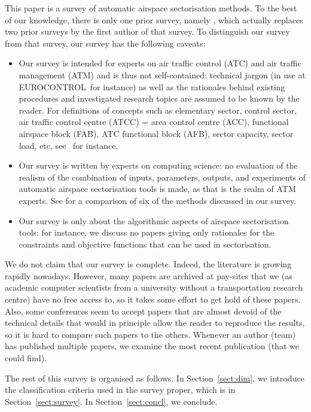 \documentclass[a4paper,12pt]{article}
\newcommand{\EuroControl}{EUROCONTROL}
\begin{document}
This paper is a survey of automatic airspace sectorisation methods.
To the best of our knowledge, there is only one prior survey, namely
\cite{Zelinski:DASC11}, which actually replaces two prior surveys by
the first author of that survey.  To distinguish our survey from that
survey, our survey has the following caveats:
\begin{itemize}
\item Our survey is intended for experts on air traffic control (ATC)
  and air traffic management (ATM) and is thus not self-contained:
  technical jargon (in use at \EuroControl\ for instance) as well as
  the rationales behind existing procedures and investigated research
  topics are assumed to be known by the reader.  For definitions of
  concepts such as elementary sector, control sector, air traffic
  control centre (ATCC) = area control centre (ACC), functional
  airspace block (FAB), ATC functional block (AFB), sector capacity,
  sector load, etc, see~\cite{ASTRA:KER:survey} for instance.
\item Our survey is written by experts on computing science: no
  evaluation of the realism of the combination of inputs, parameters,
  outputs, and experiments of automatic airspace sectorisation tools
  is made, as that is the realm of ATM experts.  See
  \cite{Zelinski:DASC11} for a comparison of six of the methods
  discussed in our survey.
\item Our survey is only about the algorithmic aspects of airspace
  sectorisation tools: for instance, we discuss no papers giving only
  rationales for the constraints and objective functions that can be
  used in sectorisation.
\end{itemize}
We do not claim that our survey is complete.  Indeed, the literature
is growing rapidly nowadays.  However, many papers are archived at
pay-sites that we (as academic computer scientists from a university
without a transportation research centre) have no free access to, so
it takes some effort to get hold of these papers.  Also, some
conferences seem to accept papers that are almost devoid of the
technical details that would in principle allow the reader to
reproduce the results, so it is hard to compare such papers to the
others.  Whenever an author (team) has published multiple papers, we
examine the most recent publication (that we could find).

The rest of this survey is organised as follows.  In
Section~\ref{sect:dim}, we introduce the classification criteria used
in the survey proper, which is in Section~\ref{sect:survey}.  In
Section~\ref{sect:concl}, we conclude.
\end{document}
